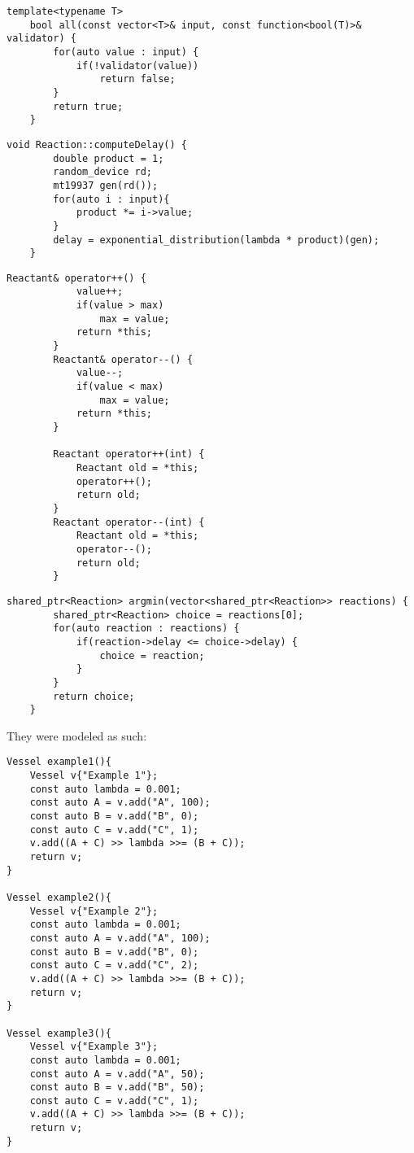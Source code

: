 \begin{lstlisting}[style=colorC++]
    template<typename T>
    bool all(const vector<T>& input, const function<bool(T)>& validator) {
        for(auto value : input) {
            if(!validator(value))
                return false;
        }
        return true;
    }
\end{lstlisting}

\begin{lstlisting}[style=colorC++]
    void Reaction::computeDelay() {
        double product = 1;
        random_device rd;
        mt19937 gen(rd());
        for(auto i : input){
            product *= i->value;
        }
        delay = exponential_distribution(lambda * product)(gen);
    }
\end{lstlisting}

\begin{lstlisting}[style=colorC++]
    Reactant& operator++() {
            value++;
            if(value > max)
                max = value;
            return *this;
        }
        Reactant& operator--() {
            value--;
            if(value < max)
                max = value;
            return *this;
        }

        Reactant operator++(int) {
            Reactant old = *this;
            operator++();
            return old;
        }
        Reactant operator--(int) {
            Reactant old = *this;
            operator--();
            return old;
        }
\end{lstlisting}

\begin{lstlisting}[style=colorC++]
    shared_ptr<Reaction> argmin(vector<shared_ptr<Reaction>> reactions) {
        shared_ptr<Reaction> choice = reactions[0];
        for(auto reaction : reactions) {
            if(reaction->delay <= choice->delay) {
                choice = reaction;
            }
        }
        return choice;
    }
\end{lstlisting}


They were modeled as such:

\begin{lstlisting}[style=colorC++]
Vessel example1(){
    Vessel v{"Example 1"};
    const auto lambda = 0.001;
    const auto A = v.add("A", 100);
    const auto B = v.add("B", 0);
    const auto C = v.add("C", 1);
    v.add((A + C) >> lambda >>= (B + C));
    return v;
}

Vessel example2(){
    Vessel v{"Example 2"};
    const auto lambda = 0.001;
    const auto A = v.add("A", 100);
    const auto B = v.add("B", 0);
    const auto C = v.add("C", 2);
    v.add((A + C) >> lambda >>= (B + C));
    return v;
}

Vessel example3(){
    Vessel v{"Example 3"};
    const auto lambda = 0.001;
    const auto A = v.add("A", 50);
    const auto B = v.add("B", 50);
    const auto C = v.add("C", 1);
    v.add((A + C) >> lambda >>= (B + C));
    return v;
}
\end{lstlisting}

